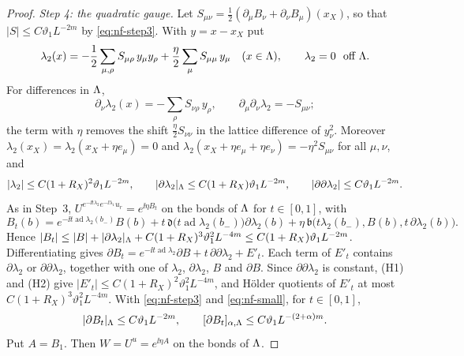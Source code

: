 \begin{proof}
\emph{Step 4: the quadratic gauge.} Let $S_{\mu\nu}=\frac12(\partial_\mu B_\nu+\partial_\nu B_\mu)(x_X)$, so that $|S|\le C\vartheta_1L^{-2m}$ by \eqref{eq:nf-step3}. With $y=x-x_X$ put
\[
\lambda_2(x)=-\frac12\sum_{\mu,\rho}S_{\mu\rho}\,y_\mu y_\rho+\frac\eta2\sum_\mu S_{\mu\mu}\,y_\mu\quad(x\in\Lambda),\qquad\lambda_2=0\ \text{ off }\Lambda .
\]
For differences in $\Lambda$,
\[
\partial_\nu\lambda_2(x)=-\sum_\rho S_{\nu\rho}\,y_\rho,\qquad\partial_\mu\partial_\nu\lambda_2=-S_{\mu\nu} ;
\]
the term with $\eta$ removes the shift $\frac\eta2S_{\nu\nu}$ in the lattice difference of $y_\nu^2$. Moreover $\lambda_2(x_X)=\lambda_2(x_X+\eta e_\mu)=0$ and $\lambda_2(x_X+\eta e_\mu+\eta e_\nu)=-\eta^2S_{\mu\nu}$ for all $\mu,\nu$, and
\[
|\lambda_2|\le C(1+R_X)^2\vartheta_1L^{-2m},\qquad|\partial\lambda_2|_\Lambda\le C(1+R_X)\vartheta_1L^{-2m},\qquad|\partial\partial\lambda_2|\le C\vartheta_1L^{-2m}.
\]
As in Step~3, $U^{e^{-\ii t\lambda_2}e^{-\ii\lambda_1}u_r}=e^{\ii\eta B_t}$ on the bonds of $\Lambda$ for $t\in[0,1]$, with
\[
B_t(b)=e^{-\ii t\operatorname{ad}\lambda_2(b_-)}B(b)+t\,\mathfrak d\big(t\operatorname{ad}\lambda_2(b_-)\big)\partial\lambda_2(b)+\eta\,\mathfrak b\big(t\lambda_2(b_-),B(b),t\,\partial\lambda_2(b)\big).
\]
Hence $|B_t|\le|B|+|\partial\lambda_2|_\Lambda+C(1+R_X)^3\vartheta_1^2L^{-4m}\le C(1+R_X)\vartheta_1L^{-2m}$. Differentiating gives $\partial B_t=e^{-\ii t\operatorname{ad}\lambda_2}\partial B+t\,\partial\partial\lambda_2+E'_t$. Each term of $E'_t$ contains $\partial\lambda_2$ or $\partial\partial\lambda_2$, together with one of $\lambda_2$, $\partial\lambda_2$, $B$ and $\partial B$. Since $\partial\partial\lambda_2$ is constant, (H1) and (H2) give $|E'_t|\le C(1+R_X)^2\vartheta_1^2L^{-4m}$, and H\"older quotients of $E'_t$ at most $C(1+R_X)^3\vartheta_1^2L^{-4m}$. With \eqref{eq:nf-step3} and \eqref{eq:nf-small}, for $t\in[0,1]$,
\begin{equation}\label{eq:nf-step4}
|\partial B_t|_\Lambda\le C\vartheta_1L^{-2m},\qquad[\partial B_t]_{\alpha,\Lambda}\le C\vartheta_1L^{-(2+\alpha)m}.
\end{equation}
Put $A=B_1$. Then $W=U^u=e^{\ii\eta A}$ on the bonds of $\Lambda$.


\end{proof}
